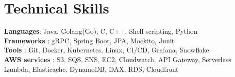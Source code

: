 \documentclass[letterpaper,11pt]{article}
\makeatletter
\newcommand{\resumeItem}[1]{
  \item\small{
    {#1 \vspace{-2pt}}
  }
}
\newcommand{\resumeProjectHeading}[2]{
    \item
    \begin{tabular*}{1.001\textwidth}{l@{\extracolsep{\fill}}r}
      \small#1 & \textbf{\small #2}\\
    \end{tabular*}\vspace{-7pt}
}
\newcommand{\resumeSubHeadingListStart}{\begin{itemize}[leftmargin=0.0in, label={}]}
\newcommand{\resumeSubHeadingListEnd}{\end{itemize}}
\newcommand{\resumeItemListStart}{\begin{itemize}}
\newcommand{\resumeItemListEnd}{\end{itemize}\vspace{-5pt}}
\makeatother
\begin{document}
\section{Technical Skills}
 \begin{itemize}[leftmargin=0.1in, label={}]
    \small{\item{
    \textbf{Languages}{: Java, Golang(Go), C, C++, Shell scripting, Python} \\
    \textbf{Frameworks} {: gRPC, Spring Boot, JPA, Mockito, Junit }\\
     \textbf{Tools} {: Git, Docker, Kubernetes, Linux, CI/CD, Grafana, Snowflake}\\
     \textbf{AWS services} {: S3, SQS, SNS, EC2, Cloudwatch, API Gateway, Serverless Lambda, Elasticache, DynamoDB, DAX, RDS, Cloudfront}
    }}
 \end{itemize}
 \vspace{-13pt}

\end{document}
